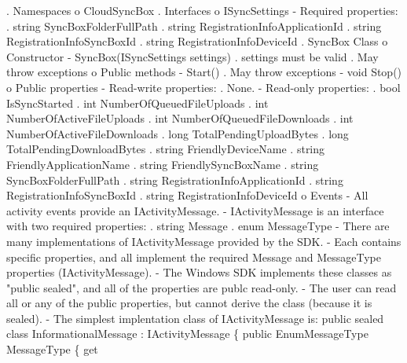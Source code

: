 
\begin{DoxyCode}
. Namespaces
  o CloudSyncBox
. Interfaces
  o ISyncSettings
    - Required properties:
      . \textcolor{keywordtype}{string} SyncBoxFolderFullPath
      . \textcolor{keywordtype}{string} RegistrationInfoApplicationId
      . \textcolor{keywordtype}{string} RegistrationInfoSyncBoxId
      . \textcolor{keywordtype}{string} RegistrationInfoDeviceId
. SyncBox Class
  o Constructor
    - SyncBox(ISyncSettings settings)
      . settings must be valid
      . May \textcolor{keywordflow}{throw} exceptions
  o Public methods
    - Start()
      . May \textcolor{keywordflow}{throw} exceptions
    - \textcolor{keywordtype}{void} Stop()
  o Public properties
    - Read-write properties:
      . None.
    - Read-only properties:
      . \textcolor{keywordtype}{bool} IsSyncStarted
      . \textcolor{keywordtype}{int} NumberOfQueuedFileUploads
      . \textcolor{keywordtype}{int} NumberOfActiveFileUploads
      . \textcolor{keywordtype}{int} NumberOfQueuedFileDownloads
      . \textcolor{keywordtype}{int} NumberOfActiveFileDownloads
      . \textcolor{keywordtype}{long} TotalPendingUploadBytes
      . \textcolor{keywordtype}{long} TotalPendingDownloadBytes
      . \textcolor{keywordtype}{string} FriendlyDeviceName
      . \textcolor{keywordtype}{string} FriendlyApplicationName
      . \textcolor{keywordtype}{string} FriendlySyncBoxName
      . \textcolor{keywordtype}{string} SyncBoxFolderFullPath
      . \textcolor{keywordtype}{string} RegistrationInfoApplicationId
      . \textcolor{keywordtype}{string} RegistrationInfoSyncBoxId
      . \textcolor{keywordtype}{string} RegistrationInfoDeviceId
  o Events
    - All activity events provide an IActivityMessage.
    - IActivityMessage is an interface with two required properties: 
      . \textcolor{keywordtype}{string} Message
      . enum MessageType
    - There are many implementations of IActivityMessage provided by the SDK.
    - Each contains specific properties, and all implement the required Message
       and MessageType properties (IActivityMessage).
    - The Windows SDK implements these classes as "public sealed", and all of 
      the properties are publc read-only.
    - The user can read all or any of the public properties, but cannot derive 
      the class (because it is sealed).
    - The simplest implentation class of IActivityMessage is:
          public sealed class InformationalMessage : IActivityMessage
          \{
              \textcolor{keyword}{public} EnumMessageType MessageType 
              \{
                  \textcolor{keyword}{get}

\end{DoxyCode}
